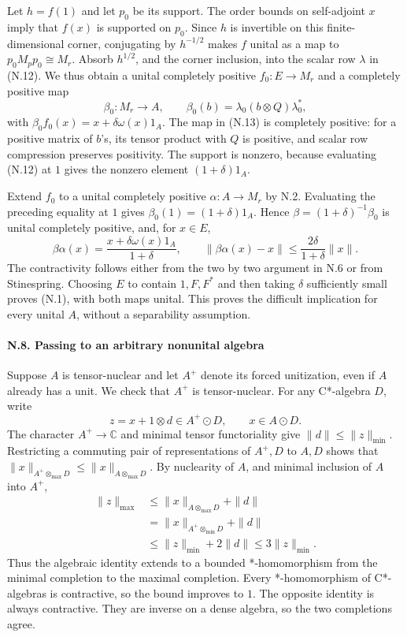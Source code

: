 \documentclass[
  11pt,
]{article}
\begin{document}
Let \(h=f(1)\) and let \(p_0\) be its support. The order bounds on
self-adjoint \(x\) imply that \(f(x)\) is supported on \(p_0\). Since
\(h\) is invertible on this finite-dimensional corner, conjugating by
\(h^{-1/2}\) makes \(f\) unital as a map to \(p_0M_pp_0\cong M_r\).
Absorb \(h^{1/2}\), and the corner inclusion, into the scalar row
\(\lambda\) in (N.12). We thus obtain a unital completely positive
\(f_0:E\to M_r\) and a completely positive map \[
\beta_0:M_r\to A,\qquad
\beta_0(b)=\lambda_0(b\otimes Q)\lambda_0^*,
\tag{N.13}
\] with \(\beta_0 f_0(x)=x+\delta\omega(x)1_A\). The map in (N.13) is
completely positive: for a positive matrix of \(b\)'s, its tensor
product with \(Q\) is positive, and scalar row compression preserves
positivity. The support is nonzero, because evaluating (N.12) at \(1\)
gives the nonzero element \((1+\delta)1_A\).

Extend \(f_0\) to a unital completely positive \(\alpha:A\to M_r\) by
N.2. Evaluating the preceding equality at \(1\) gives
\(\beta_0(1)=(1+\delta)1_A\). Hence \(\beta=(1+\delta)^{-1}\beta_0\) is
unital completely positive, and, for \(x\in E\), \[
\beta\alpha(x)=\frac{x+\delta\omega(x)1_A}{1+\delta},
\qquad
\|\beta\alpha(x)-x\|
\leq\frac{2\delta}{1+\delta}\|x\|.
\tag{N.14}
\] The contractivity follows either from the two by two argument in N.6
or from Stinespring. Choosing \(E\) to contain \(1,F,F^*\) and then
taking \(\delta\) sufficiently small proves (N.1), with both maps
unital. This proves the difficult implication for every unital \(A\),
without a separability assumption.

\paragraph{N.8. Passing to an arbitrary nonunital
algebra}\label{n.8.-passing-to-an-arbitrary-nonunital-algebra}

Suppose \(A\) is tensor-nuclear and let \(A^+\) denote its forced
unitization, even if \(A\) already has a unit. We check that \(A^+\) is
tensor-nuclear. For any C*-algebra \(D\), write \[
z=x+1\otimes d\in A^+\odot D,\qquad x\in A\odot D.
\] The character \(A^+\to\mathbb C\) and minimal tensor functoriality
give \(\|d\|\leq\|z\|_{\min}\). Restricting a commuting pair of
representations of \(A^+,D\) to \(A,D\) shows that
\(\|x\|_{A^+\otimes_{\max}D}\leq\|x\|_{A\otimes_{\max}D}\). By
nuclearity of \(A\), and minimal inclusion of \(A\) into \(A^+\), \[
\begin{aligned}
\|z\|_{\max}
&\leq\|x\|_{A\otimes_{\max}D}+\|d\|\\
&=\|x\|_{A^+\otimes_{\min}D}+\|d\|\\
&\leq\|z\|_{\min}+2\|d\|
\leq3\|z\|_{\min}.
\end{aligned}
\tag{N.15}
\] Thus the algebraic identity extends to a bounded *-homomorphism from
the minimal completion to the maximal completion. Every *-homomorphism
of C*-algebras is contractive, so the bound improves to \(1\). The
opposite identity is always contractive. They are inverse on a dense
algebra, so the two completions agree.
\end{document}
